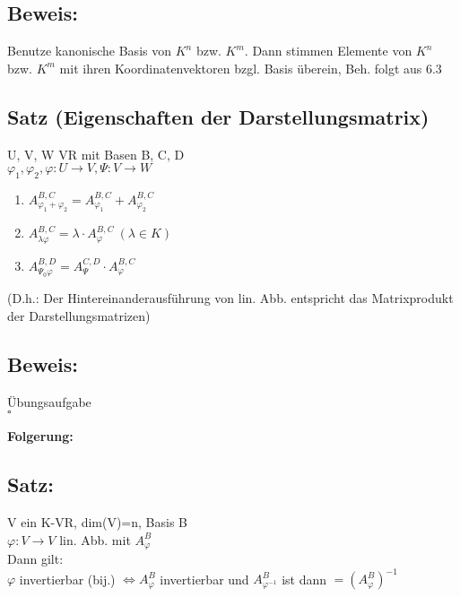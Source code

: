 \subsection*{Beweis:}
Benutze kanonische Basis von $K^n$ bzw. $K^m$. Dann stimmen Elemente von $K^n$ bzw. $K^m$ mit ihren Koordinatenvektoren bzgl. Basis überein, Beh. folgt aus 6.3

\subsection{Satz (Eigenschaften der Darstellungsmatrix)}
U, V, W VR mit Basen B, C, D\\
$\varphi_1,\varphi_2,\varphi: U\rightarrow V, \Psi: V\rightarrow W$
\begin{enumerate}
	\item
	$A_{\varphi_1+\varphi_2}^{B,C} = A_{\varphi_1}^{B,C} + A_{\varphi_2}^{B,C}$
	
	\item
	$A_{\lambda \varphi}^{B,C} = \lambda\cdot A_{\varphi}^{B,C} \ (\lambda\in K)$
	
	\item
	$A_{\Psi_0\varphi}^{B,D} = A_{\Psi}^{C,D}\cdot A_{\varphi}^{B,C}$
\end{enumerate}
(D.h.: Der Hintereinanderausführung von lin. Abb. entspricht das Matrixprodukt der Darstellungsmatrizen)

\subsection*{Beweis:}
Übungsaufgabe\\
\hspace*{13cm}$\square$


\textbf{Folgerung:}
\subsection{Satz:}
V ein K-VR, dim(V)=n, Basis B\\
$\varphi: V\rightarrow V$ lin. Abb. mit $A_{\varphi}^B$\\
Dann gilt:\\
$\varphi$ invertierbar (bij.) $\Leftrightarrow A_{\varphi}^B$ invertierbar und $A_{\varphi^{-1}}^B$ ist dann $=(A_{\varphi}^B)^{-1}$

